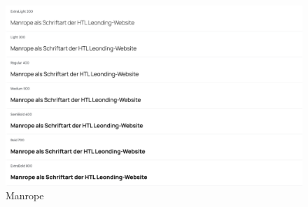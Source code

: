 \begin{figure}
   \begin{minipage}[b]{\linewidth} 
      \includegraphics[scale=0.3]{pics/manrope.png}
      \caption{Manrope}
      \label{fig:impl:manrope}
   \end{minipage}
   \hspace{.05\linewidth}
\end{figure}

